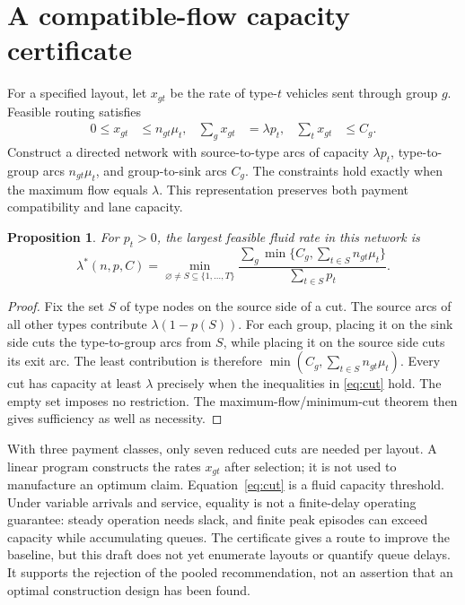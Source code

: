 \documentclass[12pt,letterpaper]{article}
\newtheorem{proposition}{Proposition}
\begin{document}
\section{A compatible-flow capacity certificate}
For a specified layout, let $x_{gt}$ be the rate of type-$t$ vehicles sent through group $g$. Feasible routing satisfies
\begin{align}
0\le x_{gt}&\le n_{gt}\mu_t, &\sum_g x_{gt}&=\lambda p_t, &\sum_t x_{gt}&\le C_g. \label{eq:flow}
\end{align}
Construct a directed network with source-to-type arcs of capacity $\lambda p_t$, type-to-group arcs $n_{gt}\mu_t$, and group-to-sink arcs $C_g$. The constraints hold exactly when the maximum flow equals $\lambda$. This representation preserves both payment compatibility and lane capacity.
\begin{proposition}
For $p_t>0$, the largest feasible fluid rate in this network is
\begin{equation}
\lambda^*(n,p,C)=\min_{\varnothing\ne S\subseteq\{1,\ldots,T\}}
\frac{\sum_g\min\{C_g,\sum_{t\in S}n_{gt}\mu_t\}}{\sum_{t\in S}p_t}.\label{eq:cut}
\end{equation}
\end{proposition}
\begin{proof}
Fix the set $S$ of type nodes on the source side of a cut. The source arcs of all other types contribute $\lambda(1-p(S))$. For each group, placing it on the sink side cuts the type-to-group arcs from $S$, while placing it on the source side cuts its exit arc. The least contribution is therefore $\min(C_g,\sum_{t\in S}n_{gt}\mu_t)$. Every cut has capacity at least $\lambda$ precisely when the inequalities in \eqref{eq:cut} hold. The empty set imposes no restriction. The maximum-flow/minimum-cut theorem then gives sufficiency as well as necessity.
\end{proof}
With three payment classes, only seven reduced cuts are needed per layout. A linear program constructs the rates $x_{gt}$ after selection; it is not used to manufacture an optimum claim. Equation~\eqref{eq:cut} is a fluid capacity threshold. Under variable arrivals and service, equality is not a finite-delay operating guarantee: steady operation needs slack, and finite peak episodes can exceed capacity while accumulating queues.
The certificate gives a route to improve the baseline, but this draft does not yet enumerate layouts or quantify queue delays. It supports the rejection of the pooled recommendation, not an assertion that an optimal construction design has been found.
\end{document}
